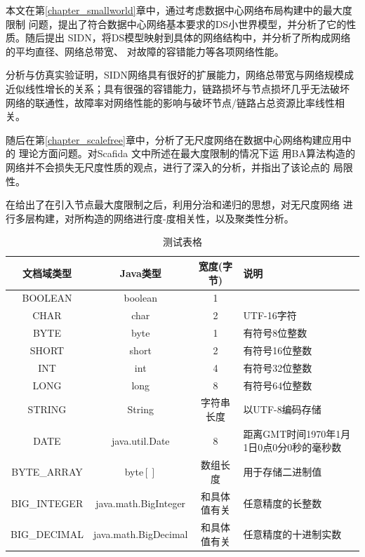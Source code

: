 \documentclass[master]{njuthesis}
\begin{document}
本文在第\ref{chapter_smallworld}章中，通过考虑数据中心网络布局构建中的最大度限制
问题，提出了符合数据中心网络基本要求的DS小世界模型，并分析了它的性质。随后提出
SIDN，将DS模型映射到具体的网络结构中，并分析了所构成网络的平均直径、网络总带宽、
对故障的容错能力等各项网络性能。

分析与仿真实验证明，SIDN网络具有很好的扩展能力，网络总带宽与网络规模成
近似线性增长的关系；具有很强的容错能力，链路损坏与节点损坏几乎无法破坏
网络的联通性，故障率对网络性能的影响与破坏节点/链路占总资源比率线性相关。

随后在第\ref{chapter_scalefree}章中，分析了无尺度网络在数据中心网络构建应用中的
理论方面问题。对Scafida \cite{gyarmati2010scafida}文中所述在最大度限制的情况下运
用BA算法构造的网络并不会损失无尺度性质的观点，进行了深入的分析，并指出了该论点的
局限性。

在给出了在引入节点最大度限制之后，利用分治和递归的思想，对无尺度网络
进行多层构建，对所构造的网络进行度-度相关性，以及聚类性分析。

\begin{table}
  \centering
  \begin{tabular}{cccp{38mm}}
    \toprule
    \textbf{文档域类型} & \textbf{Java类型} & \textbf{宽度(字节)} & \textbf{说明} \\
    \midrule
    BOOLEAN  & boolean &  1  & \\
    CHAR     & char    &  2  & UTF-16字符 \\
    BYTE     & byte    &  1  & 有符号8位整数 \\
    SHORT    & short   &  2  & 有符号16位整数 \\
    INT      & int     &  4  & 有符号32位整数 \\
    LONG     & long    &  8  & 有符号64位整数 \\
    STRING   & String  &  字符串长度  & 以UTF-8编码存储 \\
    DATE     & java.util.Date & 8 & 距离GMT时间1970年1月1日0点0分0秒的毫秒数 \\
    BYTE\_ARRAY & byte$[]$ & 数组长度 & 用于存储二进制值 \\
    BIG\_INTEGER & java.math.BigInteger & 和具体值有关 & 任意精度的长整数 \\
    BIG\_DECIMAL & java.math.BigDecimal & 和具体值有关 & 任意精度的十进制实数 \\
    \bottomrule
  \end{tabular}
  \caption{测试表格}\label{table:test5}
\end{table}
\end{document}
